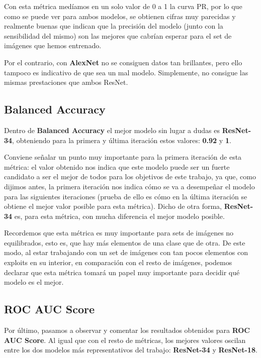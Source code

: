 Con esta métrica medíamos en un solo valor de 0 a 1 la curva \ac{PR}, por lo que como se puede ver para ambos modelos, se obtienen cifras muy parecidas y realmente buenas que indican que la precisión del modelo (junto con la sensibilidad del mismo) son las mejores que cabrían esperar para el set de imágenes que hemos entrenado.

Por el contrario, con \textbf{AlexNet} no se consiguen datos tan brillantes, pero ello tampoco es indicativo de que sea un mal modelo. Simplemente, no consigue las mismas prestaciones que ambos ResNet.

\subsection{Balanced Accuracy}

Dentro de \textbf{Balanced Accuracy} el mejor modelo sin lugar a dudas es \textbf{ResNet-34}, obteniendo para la primera y última iteración estos valores: \textbf{0.92} y \textbf{1}.

Conviene señalar un punto muy importante para la primera iteración de esta métrica: el valor obtenido nos indica que este modelo puede ser un fuerte candidato a ser el mejor de todos para los objetivos de este trabajo, ya que, como dijimos antes, la primera iteración nos indica cómo se va a desempeñar el modelo para las siguientes iteraciones (prueba de ello es cómo en la última iteración se obtiene el mejor valor posible para esta métrica). Dicho de otra forma, \textbf{ResNet-34} es, para esta métrica, con mucha diferencia el mejor modelo posible.

Recordemos que esta métrica es muy importante para sets de imágenes no equilibrados, esto es, que hay más elementos de una clase que de otra. De este modo, al estar trabajando con un set de imágenes con tan pocos elementos con exploits en su interior, en comparación con el resto de imágenes, podemos declarar que esta métrica tomará un papel muy importante para decidir qué modelo es el mejor.

\subsection{ROC AUC Score}

Por último, pasamos a observar y comentar los resultados obtenidos para \textbf{ROC AUC Score}. Al igual que con el resto de métricas, los mejores valores oscilan entre los dos modelos más representativos del trabajo: \textbf{ResNet-34} y \textbf{ResNet-18}.

